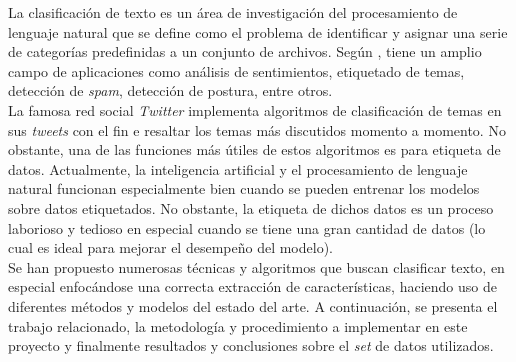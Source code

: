 La clasificación de texto es un área de investigación del procesamiento de lenguaje natural que se define como el problema de identificar y asignar una serie de categorías predefinidas a un conjunto de archivos. Según \cite{mokey_learn}, tiene un amplio campo de aplicaciones como análisis de sentimientos, etiquetado de temas, detección de \textit{spam}, detección de postura, entre otros.\\

La famosa red social \textit{Twitter} implementa algoritmos de clasificación de temas en sus \textit{tweets} con el fin e resaltar los temas más discutidos momento a momento. No obstante, una de las funciones más útiles de estos algoritmos es para etiqueta de datos. Actualmente, la inteligencia artificial y el procesamiento de lenguaje natural funcionan especialmente bien cuando se pueden entrenar los modelos sobre datos etiquetados. No obstante, la etiqueta de dichos datos es un proceso laborioso y tedioso en especial cuando se tiene una gran cantidad de datos (lo cual es ideal para mejorar el desempeño del modelo).\\

Se han propuesto numerosas técnicas y algoritmos que buscan clasificar texto, en especial enfocándose una correcta extracción de características, haciendo uso de diferentes métodos y modelos del estado del arte. A continuación, se presenta el trabajo relacionado, la metodología y procedimiento a implementar en este proyecto y finalmente resultados y conclusiones sobre el \textit{set} de datos utilizados.

\newpage